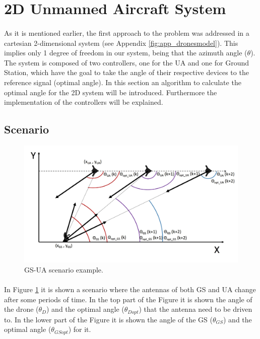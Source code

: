 
\section{2D Unmanned Aircraft System}\label{sec:2d_sim}
\paragraph{}As it is mentioned earlier, the first approach to the problem was addressed in a cartesian 2-dimensional system (see Appendix \ref{fig:app_dronesmodel}). This implies only 1 degree of freedom in our system, being that the azimuth angle ($\theta$). The system is composed of two controllers, one for the UA and one for Ground Station, which have the goal to take the angle of their respective devices to the reference signal (optimal angle). In this section an algorithm to calculate the optimal angle for the 2D system will be introduced. Furthermore the implementation of the controllers will be explained.

\subsection*{Scenario}

\begin{figure}[h]
	\centering
	\includegraphics[scale=0.45]{figures/drone_gs_ex_1.jpg}
	\caption{GS-UA scenario example.}
	\label{fig:ua_gs}
\end{figure}

\paragraph{}In Figure \ref{fig:ua_gs} it is shown a scenario where the antennas of both GS and UA change after some periods of time. In the top part of the Figure it is shown the angle of the drone ($\theta_{D}$) and the optimal angle ($\theta_{Dopt}$) that the antenna need to be driven to. In the lower part of the Figure it is shown the angle of the GS ($\theta_{GS}$) and the optimal angle ($\theta_{GSopt}$) for it. 

